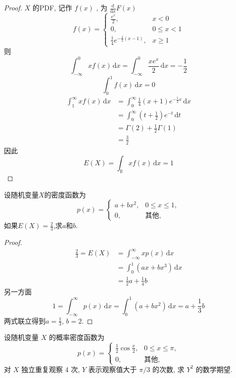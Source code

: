 \documentclass[../main.tex]{subfiles}
\begin{document}
\begin{proof}
    \(  X  \) 的PDF, 记作 \(  f\left( x \right)   \) , 为 \(  \frac{\mathrm{d}}{\mathrm{d}x} F\left( x \right)   \) \[
    f\left( x \right)= \begin{cases} \frac{e^{x} }{2 },&x< 0\\ 
     0,&0\le x< 1\\ 
      \frac{1 }{4 }e^{-\frac{1 }{2 }\left( x-1 \right)  }  ,&x\ge 1 \end{cases}  
    \]则 \[
    \int_{-\infty}^{0}xf\left( x \right)\,\mathrm{d} x= \int_{-\infty}^{0}\frac{xe^{x} }{2 }\,\mathrm{d} x= -\frac{1 }{2 }    
    \] \[
    \int_{0}^{1}f\left( x \right)\,\mathrm{d} x= 0 
    \] \[
   \begin{aligned}
    \int_{1}^{\infty}xf\left( x \right)\,\mathrm{d} x&= \int_{0}^{\infty}\frac{1 }{4 }\left( x+ 1 \right) e^{-\frac{1 }{2 }x }\,\mathrm{d} x   \\ 
     &=  \int_{0}^{\infty}\left( t+ \frac{1 }{2 }  \right)e^{-t}\,\mathrm{d} t\\ 
      &=   \Gamma \left( 2 \right)+ \frac{1 }{2 } \Gamma \left( 1 \right)\\ 
       &= \frac{3 }{2 }    
   \end{aligned}
    \]因此 \[
    E\left( X \right)= \int_{\mathbb{R} }xf\left( x \right)\,\mathrm{d} x= 1
    \]
\end{proof}
\begin{exercise}{}{}
    设随机变量$X$的密度函数为
$$p(x) = \begin{cases} a+bx^2, & 0 \le x \le 1, \\ 0, & \text{其他}, \end{cases}$$
如果$E(X)=\frac{2}{3}$,求$a$和$b$.
\end{exercise}
\begin{proof}
      \[
      \begin{aligned}
      \frac{2 }{3 }= E\left( X \right)&=  \int_{-\infty}^{\infty}xp\left( x \right)\,\mathrm{d} x   \\ 
       &= \int_{0}^{1}\left( ax+ bx^{3} \right) \,\mathrm{d} x \\ 
        &= \frac{1}{2}a+ \frac{1}{4}b
      \end{aligned}
      \]另一方面 \[
   1=    \int_{-\infty}^{\infty}p\left( x \right)\,\mathrm{d} x= \int_{0}^{1}\left( a+ bx^{2} \right)\,\mathrm{d} x= a+ \frac{1 }{3 }b  
      \]两式联立得到\(  a= \frac{1 }{3 }   \), \(  b= 2  \).  
\end{proof}
\begin{exercise}{}{}
    设随机变量 $X$ 的概率密度函数为
$$p(x) = \begin{cases} \frac{1}{2}\cos\frac{x}{2}, & 0 \le x \le \pi, \\ 0, & \text{其他}, \end{cases}$$
对 $X$ 独立重复观察 4 次, $Y$ 表示观察值大于 $\pi/3$ 的次数, 求 $Y^2$ 的数学期望.
\end{exercise}
\end{document}
